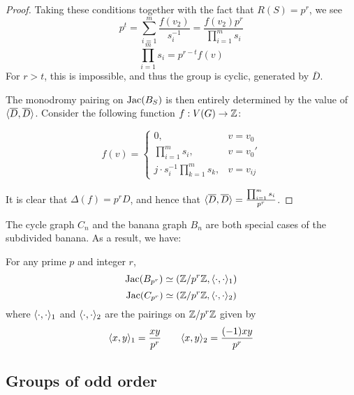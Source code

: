 \documentclass{amsart}
\begin{document}
\begin{proof}
  Taking these conditions together with the fact that $R(S) = p^r$, we
  see
  \begin{equation*}
    p^t = \sum_{i=1}^m \frac{f(v_2)}{s_i^{-1}} = 
    \frac{f(v_2) p^r}{\prod_{i=1}^ms_i}
  \end{equation*}
  \begin{equation*}
    \prod_{i=1}^ms_i = p^{r-t}f(v)
  \end{equation*}
  For $r > t$, this is impossible, and thus the group is cyclic,
  generated by $\overline{D}$. 

  The monodromy pairing on $\operatorname{Jac}(B_S)$ is then entirely determined by
  the value of $\langle \overline{D}, \overline{D} \rangle$. Consider the
  following function $f:V(G) \to \mathbb{Z}$:

  \begin{equation*}
    f(v) = 
    \begin{cases}
      0, & v = v_0 \\
      \prod_{i=1}^ms_i, & v = v_0' \\
      j \cdot s_i^{-1}\prod_{k=1}^ms_k, & v = v_{ij}
    \end{cases}
  \end{equation*}

  It is clear that $\Delta(f) = p^rD$, and hence that
  $\langle \overline{D}, \overline{D} \rangle = \frac{\prod_{i=1}^ms_i}{p^r}$.
\end{proof}

The cycle graph $C_n$ and the banana graph $B_n$ are both special
cases of the subdivided banana. As a result, we have:

\begin{cor}
  For any prime $p$ and integer $r$, 
  \begin{equation*}
    \operatorname{Jac}(B_{p^r}) \simeq (\mathbb{Z}/p^r\mathbb{Z}, \langle \cdot, \cdot \rangle_1)
  \end{equation*}
  \begin{equation*}
    \operatorname{Jac}(C_{p^r}) \simeq (\mathbb{Z}/p^r\mathbb{Z}, \langle \cdot, \cdot \rangle_2)
  \end{equation*}
  where $\langle \cdot, \cdot \rangle_1$ and $\langle \cdot, \cdot \rangle_2$ are the
  pairings on $\mathbb{Z}/p^r\mathbb{Z}$ given by
  \begin{equation*}
    \langle x, y \rangle_1 = \frac{xy}{p^r} \qquad \langle x, y \rangle_2 = \frac{(-1)xy}{p^r}
  \end{equation*}
\end{cor}

\subsection{Groups of odd order}
\label{sec:odd_groups}
\end{document}

